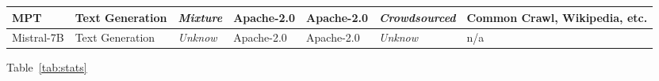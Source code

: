 \begin{table*}[t]
\begin{tabular}{|p{2.1cm}|p{1.6cm}|p{2cm}|p{2.75cm}|p{3cm}|p{1.7cm}|p{2cm}|}
      MPT & Text Generation & \textit{Mixture} & Apache-2.0 & Apache-2.0 & \textit{Crowdsourced} & Common Crawl, \newline Wikipedia, etc. \\ \hline

      Mistral-7B & Text Generation & \textit{Unknow} & Apache-2.0 & Apache-2.0 & \textit{Unknow} & n/a \\ \hline
  

  \end{tabular}
\end{table*}

Table~\ref{tab:stats}

